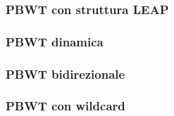 \subsubsection{PBWT con struttura LEAP}
\subsubsection{PBWT dinamica}
\subsubsection{PBWT bidirezionale}
\subsubsection{PBWT con wildcard}
